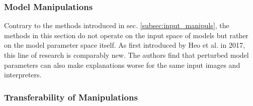 \subsubsection{Model Manipulations}
Contrary to the methods introduced in sec. \ref{subsec:input_manipuls}, the methods in this section do not operate on the input space of models but rather on the model parameter space itself. 
As first introduced by Heo et al. \cite{fooling_nn_interpreters} in 2017, this line of research is comparably new. The authors find that perturbed model parameters can also make explanations worse for the same input images and interpreters. 


\subsubsection{Transferability of Manipulations}